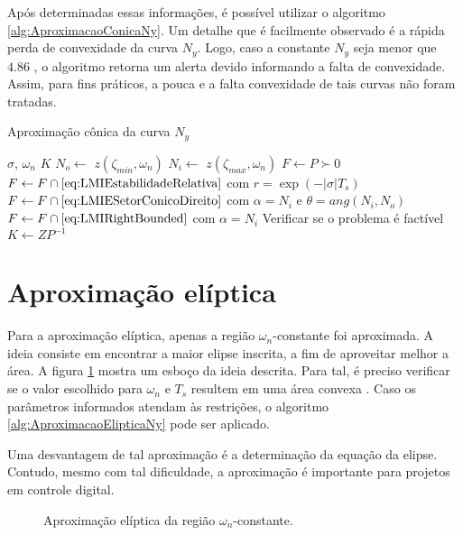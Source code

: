 Após determinadas essas informações, é possível utilizar o algoritmo \ref{alg:AproximacaoConicaNy}. Um detalhe que é facilmente observado é a rápida perda de convexidade da curva $N_y$. Logo, caso a constante $N_y$ seja menor que $4.86$ \cite{CHIQUETO2021}, o algoritmo retorna um alerta devido informando a falta de convexidade. Assim, para fins práticos, a pouca e a falta convexidade de tais curvas não foram tratadas.
\begin{algorithm}[hb!]
  \caption{Aproximação cônica da curva $N_y$}\label{alg:AproximacaoConicaNy}
  \begin{algorithmic}[1]
    \Require $\sigma$, $\omega_n$
    \Ensure $K$
    \State $N_o \gets $ $z(\zeta_{min},\omega_n)$
    \State $N_i \gets $ $z(\zeta_{max},\omega_n)$
    \State $F \gets P \succ 0$
    \State $F \gets F \cap \eqref{eq:LMIEstabilidadeRelativa}$ com $r = \exp{\left(-|\sigma|T_s\right)}$ 
    \State $F \gets F \cap \eqref{eq:LMIESetorConicoDireito}$ com $\alpha = N_i$ e $\theta = ang(N_i,N_o)$ 
    \State $F \gets F \cap \eqref{eq:LMIRightBounded}$ com $\alpha = N_i$ 
    \State Verificar se o problema é factível
    \State $K \gets ZP^{-1}$
  \end{algorithmic}
\end{algorithm}

\section{Aproximação elíptica}
Para a aproximação elíptica, apenas a região $\omega_n$-constante foi aproximada. A ideia consiste em encontrar a maior elipse inscrita, a fim de aproveitar melhor a área. A figura \ref{fig:AproximacaoEliptica} mostra um esboço da ideia descrita.  Para tal, é preciso verificar se o valor escolhido para $\omega_n$ e $T_s$ resultem em uma área convexa \cite{CHIQUETO2021}. Caso os parâmetros informados atendam às restrições, o algoritmo \ref{alg:AproximacaoElipticaNy} pode ser aplicado.

Uma desvantagem de tal aproximação é a determinação da equação da elipse. Contudo, mesmo com tal dificuldade, a aproximação é importante para projetos em controle digital.
\begin{figure}[!ht]
  \centering
  
  \caption{Aproximação elíptica da região $\omega_n$-constante.}
  \label{fig:AproximacaoEliptica}
\end{figure}

